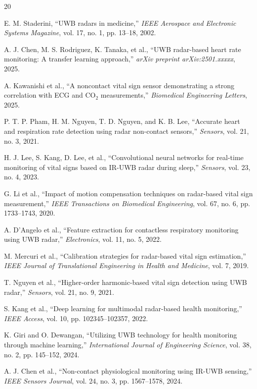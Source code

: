 \documentclass[conference]{IEEEtran}
\begin{document}
\begin{thebibliography}{20}

E. M. Staderini, ``UWB radars in medicine,'' \textit{IEEE Aerospace and Electronic Systems Magazine}, vol. 17, no. 1, pp. 13--18, 2002.

A. J. Chen, M. S. Rodriguez, K. Tanaka, et al., ``UWB radar-based heart rate monitoring: A transfer learning approach,'' \textit{arXiv preprint arXiv:2501.xxxxx}, 2025.

A. Kawanishi et al., ``A noncontact vital sign sensor demonstrating a strong correlation with ECG and CO$_2$ measurements,'' \textit{Biomedical Engineering Letters}, 2025.

P. T. P. Pham, H. M. Nguyen, T. D. Nguyen, and K. B. Lee, ``Accurate heart and respiration rate detection using radar non-contact sensors,'' \textit{Sensors}, vol. 21, no. 3, 2021.

H. J. Lee, S. Kang, D. Lee, et al., ``Convolutional neural networks for real-time monitoring of vital signs based on IR-UWB radar during sleep,'' \textit{Sensors}, vol. 23, no. 4, 2023.

G. Li et al., ``Impact of motion compensation techniques on radar-based vital sign measurement,'' \textit{IEEE Transactions on Biomedical Engineering}, vol. 67, no. 6, pp. 1733--1743, 2020.

A. D'Angelo et al., ``Feature extraction for contactless respiratory monitoring using UWB radar,'' \textit{Electronics}, vol. 11, no. 5, 2022.

M. Mercuri et al., ``Calibration strategies for radar-based vital sign estimation,'' \textit{IEEE Journal of Translational Engineering in Health and Medicine}, vol. 7, 2019.

T. Nguyen et al., ``Higher-order harmonic-based vital sign detection using UWB radar,'' \textit{Sensors}, vol. 21, no. 9, 2021.

S. Kang et al., ``Deep learning for multimodal radar-based health monitoring,'' \textit{IEEE Access}, vol. 10, pp. 102345--102357, 2022.

K. Giri and O. Dewangan, ``Utilizing UWB technology for health monitoring through machine learning,'' \textit{International Journal of Engineering Science}, vol. 38, no. 2, pp. 145--152, 2024.

A. J. Chen et al., ``Non-contact physiological monitoring using IR-UWB sensing,'' \textit{IEEE Sensors Journal}, vol. 24, no. 3, pp. 1567--1578, 2024.


\end{thebibliography}
\end{document}
